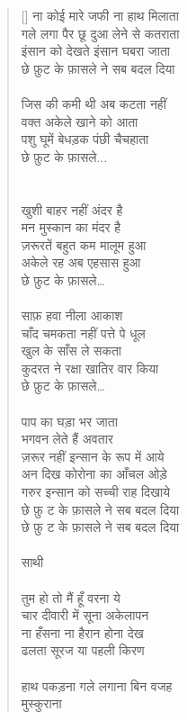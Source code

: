 \begin{verse}[\versewidth]\texthindi{
ना कोई मारे जफी ना हाथ मिलाता\\
गले लगा पैर छू दुआ लेने से कतराता\\
इंसान को देखते इंसान घबरा जाता\\
छे फ़ुट के फ़ासले ने सब बदल दिया\\
\\
जिस की कमी थी अब कटता नहीं\\
वक्त अकेले खाने को आता\\
पशु घूमें बेधड़क पंछी चैचहाता\\
छे फ़ुट के फ़ासले...\\
\\
\\
खुशी बाहर नहीं अंदर है\\
मन मुस्कान का मंदर है\\
ज़रूरतें बहुत कम मालूम हुआ\\
अकेले रह अब एहसास हुआ\\
छे फ़ुट के फ़ासले…\\
\\
साफ़ हवा नीला आकाश\\
चाँद चमकता नहीं पत्ते पे धूल\\
खुल के साँस ले सकता\\
कुदरत ने रक्षा खातिर वार किया\\
छे फ़ुट के फ़ासले…\\
\\
पाप का घड़ा भर जाता\\
भगवन लेते हैं अवतार\\
ज़रूर नहीं इन्सान के रूप में आये\\
अन दिख कोरोना का आँचल ओड़े\\
गरुर इन्सान को सच्ची राह दिखाये\\
छे फ़ु ट के फ़ासले ने सब बदल दिया\\
छे फ़ु ट के फ़ासले ने सब बदल दिया\\
\\
साथी\\
\\
तुम हो तो मैं हूँ वरना ये\\
चार दीवारी में सूना अकेलापन\\
ना हँसना ना हैरान होना देख\\
ढलता सूरज या पहली किरण\\
\\
हाथ पकड़ना गले लगाना बिन वजह\\
मुस्कुराना\\
}
\end{verse}
